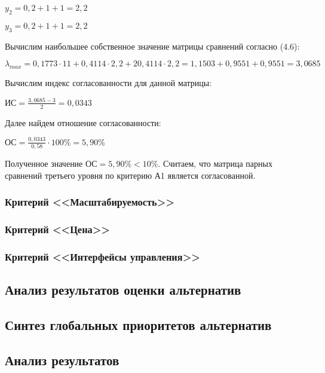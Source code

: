 $y_2 = 0,2 + 1 + 1 = 2,2$

$y_3 = 0,2 + 1 + 1 = 2,2$

Вычислим наибольшее собственное значение матрицы сравнений согласно (4.6):

$\lambda_{max} = 0,1773 \cdot 11 + 0,4114 \cdot  2,2 + 20,4114 \cdot 2,2 = 1,1503 + 0,9551 + 0,9551 = 3,0685$

Вычислим индекс согласованности для данной матрицы:

$\text{ИС} = \frac{3,0685 - 3}{2} = 0,0343$

Далее найдем отношение согласованности:

$\text{ОС} = \frac{0,0343}{0,58} \cdot 100\% = 5,90\%$

Полученное значение $\text{ОС} = 5,90\% < 10\%$.
Считаем, что матрица парных сравнений третьего уровня по критерию А1 является согласованной.

\subsubsection{Критерий <<Масштабируемость>>}

\subsubsection{Критерий <<Цена>>}

\subsubsection{Критерий <<Интерфейсы управления>>}

\subsection{Анализ результатов оценки альтернатив}

\subsection{Синтез глобальных приоритетов альтернатив}

\subsection{Анализ результатов}

\clearpage
